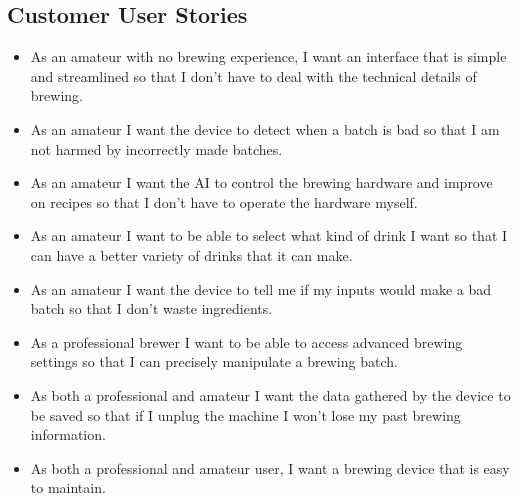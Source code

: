 \documentclass[draftclsnofoot,onecolumn,letterpaper,10pt]{IEEEtran}
\begin{document}
\subsection{Customer User Stories}
\begin{itemize}
	\item As an amateur with no brewing experience, I want an interface that is simple and streamlined so that I don't have to deal with the technical details of brewing.
	\item As an amateur I want the device to detect when a batch is bad so that I am not harmed by incorrectly made batches.
	\item As an amateur I want the AI to control the brewing hardware and improve on recipes so that I don't have to operate the hardware myself.
	\item As an amateur I want to be able to select what kind of drink I want so that I can have a better variety of drinks that it can make.
	\item As an amateur I want the device to tell me if my inputs would make a bad batch so that I don't waste ingredients.
	\item As a professional brewer I want to be able to access advanced brewing settings so that I can precisely manipulate a brewing batch.
	\item As both a professional and amateur I want the data gathered by the device to be saved so that if I unplug the machine I won't lose my past brewing information.
	\item As both a professional and amateur user, I want a brewing device that is easy to maintain.
\end{itemize}
\end{document}
